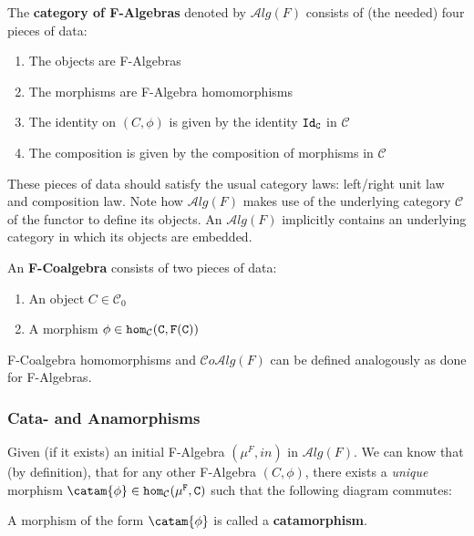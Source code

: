 \newcommand{\alg}[1]{\mathcal{A}lg(#1)}
\newcommand{\coalg}[1]{\mathcal{C}o\mathcal{A}lg(#1)}

The \textbf{category of F-Algebras} denoted by $\alg{F}$ consists of (the needed) four pieces of data:
\begin{enumerate}
    \item The objects are F-Algebras
    \item The morphisms are F-Algebra homomorphisms
    \item The identity on $(C,\phi)$ is given by the identity $\tt{Id}_C$ in $\mathcal{C}$
    \item The composition is given by the composition of morphisms in $\mathcal{C}$
\end{enumerate}
These pieces of data should satisfy the usual category laws: left/right unit law and composition law.
Note how $\alg{F}$ makes use of the underlying category $\mathcal{C}$ of the functor to define its objects. An $\alg{F}$ implicitly contains an underlying category in which its objects are embedded.

An \textbf{F-Coalgebra} consists of two pieces of data:
\begin{enumerate}
    \item An object $C\in \mathcal{C}_0$
    \item A morphism $\phi\in\tt{hom}_\mathcal{C}(C,F(C))$
\end{enumerate}
F-Coalgebra homomorphisms and $\coalg{F}$ can be defined analogously as done for F-Algebras.

\subsubsection{Cata- and Anamorphisms}
Given (if it exists) an initial F-Algebra $(\mu^F,in)$ in $\alg{F}$. We can know that (by definition), that for any other F-Algebra $(C,\phi)$, there exists a \textit{unique} morphism $\catam{\phi}\in\homm{C}{\mu^F,C}$ such that the following diagram commutes:
\begin{figure}[H]\vspace{-1em}\hfill
{}\hfill\null
\end{figure}\vspace{-1em}
A morphism of the form $\catam{\phi}$ is called a \textbf{catamorphism}.

